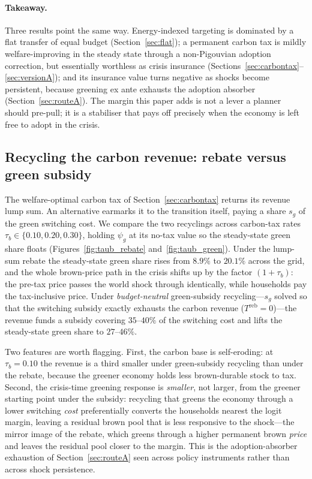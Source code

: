 \documentclass[11pt,a4paper]{article}
\begin{document}
\paragraph{Takeaway.} Three results point the same way. Energy-indexed targeting
is dominated by a flat transfer of equal budget (Section~\ref{sec:flat}); a
permanent carbon tax is mildly welfare-improving in the steady state through a
non-Pigouvian adoption correction, but essentially worthless as crisis insurance
(Sections~\ref{sec:carbontax}--\ref{sec:versionA}); and its insurance value turns
negative as shocks become persistent, because greening ex ante exhausts the
adoption absorber (Section~\ref{sec:routeA}). The margin this paper adds is not a
lever a planner should pre-pull; it is a stabiliser that pays off precisely when
the economy is left free to adopt in the crisis.



\subsection{Recycling the carbon revenue: rebate versus green subsidy}
\label{sec:recycle}

The welfare-optimal carbon tax of Section~\ref{sec:carbontax} returns its
revenue lump sum. An alternative earmarks it to the transition itself, paying a
share $s_g$ of the green switching cost. We compare the two recyclings across
carbon-tax rates $\tau_b\in\{0.10,0.20,0.30\}$, holding $\psi_g$ at its no-tax
value so the steady-state green share floats (Figures~\ref{fig:taub_rebate}
and~\ref{fig:taub_green}). Under the lump-sum rebate the steady-state green
share rises from $8.9\%$ to $20.1\%$ across the grid, and the whole brown-price
path in the crisis shifts up by the factor $(1+\tau_b)$: the pre-tax price
passes the world shock through identically, while households pay the
tax-inclusive price. Under \emph{budget-neutral} green-subsidy recycling---$s_g$
solved so that the switching subsidy exactly exhausts the carbon revenue
($T^{\mathrm{reb}}=0$)---the revenue funds a subsidy covering $35$--$40\%$ of
the switching cost and lifts the steady-state green share to $27$--$46\%$.

Two features are worth flagging. First, the carbon base is self-eroding: at
$\tau_b=0.10$ the revenue is a third smaller under green-subsidy recycling than
under the rebate, because the greener economy holds less brown-durable stock to
tax. Second, the crisis-time greening response is \emph{smaller}, not larger,
from the greener starting point under the subsidy: recycling that greens the
economy through a lower switching \emph{cost} preferentially converts the
households nearest the logit margin, leaving a residual brown pool that is less
responsive to the shock---the mirror image of the rebate, which greens through a
higher permanent brown \emph{price} and leaves the residual pool closer to the
margin. This is the adoption-absorber exhaustion of Section~\ref{sec:routeA}
seen across policy instruments rather than across shock persistence.
\end{document}
